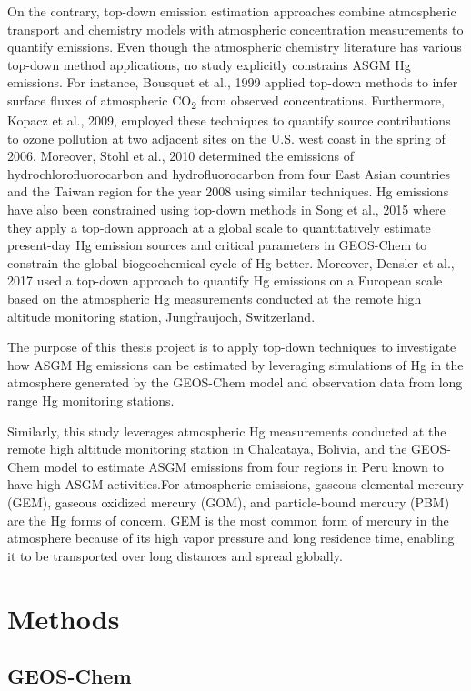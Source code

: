 On the contrary, top-down emission estimation approaches combine atmospheric transport and chemistry models with atmospheric concentration measurements to quantify emissions. Even though the atmospheric chemistry literature has various top-down method applications, no study explicitly constrains ASGM Hg emissions. For instance, Bousquet et al., 1999 applied top-down methods to infer surface fluxes of atmospheric CO\textsubscript{2} from observed concentrations. Furthermore, Kopacz et al., 2009, employed these techniques to quantify source contributions to ozone pollution at two adjacent sites on the U.S. west coast in the spring of 2006. Moreover, Stohl et al., 2010 determined the emissions of hydrochlorofluorocarbon and hydrofluorocarbon from four East Asian countries and the Taiwan region for the year 2008 using similar techniques. Hg emissions have also been constrained using top-down methods in Song et al., 2015 where they apply a top-down approach at a global scale to quantitatively estimate present-day Hg emission sources and critical parameters in GEOS-Chem to constrain the global biogeochemical cycle of Hg better. Moreover, Densler et al., 2017 used a top-down approach to quantify Hg emissions on a European scale based on the atmospheric Hg measurements conducted at the remote high altitude monitoring station, Jungfraujoch, Switzerland.

The purpose of this thesis project is to apply top-down techniques to investigate how ASGM Hg emissions can be estimated by leveraging simulations of Hg in the atmosphere generated by the GEOS-Chem model and observation data from long range Hg monitoring stations. 

Similarly, this study leverages atmospheric Hg measurements conducted at the remote high altitude monitoring station in Chalcataya, Bolivia, and the GEOS-Chem model to estimate ASGM emissions from four regions in Peru known to have high ASGM activities.For atmospheric emissions, gaseous elemental mercury (GEM), gaseous oxidized mercury (GOM), and particle-bound mercury (PBM) are the Hg forms of concern. GEM is the most common form of mercury in the atmosphere because of its high vapor pressure and long residence time, enabling it to be transported over long distances and spread globally.


\section{Methods}


\subsection*{GEOS-Chem}

